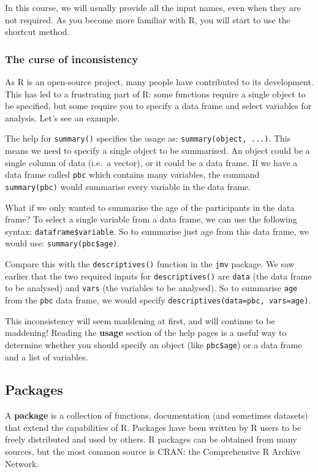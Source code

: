 \documentclass[
  a4paper,
]{memoir}
\begin{document}
In this course, we will usually provide all the input names, even when
they are not required. As you become more familiar with R, you will
start to use the shortcut method.

\subsubsection{The curse of
inconsistency}\label{the-curse-of-inconsistency}

As R is an open-source project, many people have contributed to its
development. This has led to a frustrating part of R: some functions
require a single object to be specified, but some require you to specify
a data frame and select variables for analysis. Let's see an example.

The help for \texttt{summary()} specifies the usage as:
\texttt{summary(object,\ ...)}. This means we need to specify a single
object to be summarised. An object could be a single column of data
(i.e.~a vector), or it could be a data frame. If we have a data frame
called \texttt{pbc} which contains many variables, the command
\texttt{summary(pbc)} would summarise every variable in the data frame.

What if we only wanted to summarise the age of the participants in the
data frame? To select a single variable from a data frame, we can use
the following syntax: \texttt{dataframe\$variable}. So to summarise just
age from this data frame, we would use: \texttt{summary(pbc\$age)}.

Compare this with the \texttt{descriptives()} function in the
\texttt{jmv} package. We saw earlier that the two required inputs for
\texttt{descriptives()} are \texttt{data} (the data frame to be
analysed) and \texttt{vars} (the variables to be analysed). So to
summarise \texttt{age} from the \texttt{pbc} data frame, we would
specify \texttt{descriptives(data=pbc,\ vars=age)}.

This inconsistency will seem maddening at first, and will continue to be
maddening! Reading the \textbf{usage} section of the help pages is a
useful way to determine whether you should specify an object (like
\texttt{pbc\$age}) or a data frame and a list of variables.

\subsection{Packages}\label{packages}

A \textbf{package} is a collection of functions, documentation (and
sometimes datasets) that extend the capabilities of R. Packages have
been written by R users to be freely distributed and used by others. R
packages can be obtained from many sources, but the most common source
is CRAN: the Comprehensive R Archive Network.
\end{document}

